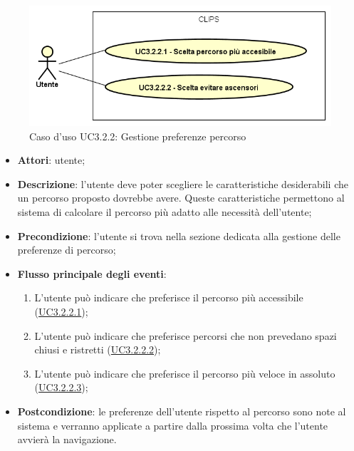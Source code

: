 \documentclass[../AnalisiDeiRequisiti.tex]{subfiles}
\begin{document}
\begin{figure}[H]
	\centering
	\includegraphics[scale=0.95, width=\textwidth]{img/UC3-2-2.png}
	\caption{Caso d'uso UC3.2.2: Gestione preferenze percorso}\label{fig:UC3.2.2} 
\end{figure}
\begin{itemize}
	\item \textbf{Attori}: utente;
	\item \textbf{Descrizione}: l'utente deve poter scegliere le caratteristiche desiderabili che un percorso proposto dovrebbe avere. Queste caratteristiche permettono al sistema di calcolare il percorso più adatto alle necessità dell'utente; 
	\item \textbf{Precondizione}: l'utente si trova nella sezione dedicata alla gestione delle preferenze di percorso;
	
	\item \textbf{Flusso principale degli eventi}:
	\begin{enumerate}
		\item L'utente può indicare che preferisce il percorso più accessibile (\hyperlink{UC3.2.2.1}{UC3.2.2.1});
		\item L'utente può indicare che preferisce percorsi che non prevedano spazi chiusi e ristretti  (\hyperlink{UC3.2.2.2}{UC3.2.2.2});
		\item L'utente può indicare che preferisce il percorso più veloce in assoluto (\hyperlink{UC3.2.2.3}{UC3.2.2.3});
		
	\end{enumerate}
	\item \textbf{Postcondizione}: le preferenze dell'utente rispetto al percorso sono note al sistema e verranno applicate a partire dalla prossima volta che l'utente avvierà la navigazione.
\end{itemize}
\hypertarget{UC3.2.2.1}{}
\end{document}
